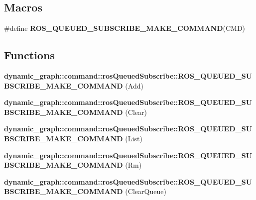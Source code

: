 \subsection*{Macros}
\begin{DoxyCompactItemize}
\item 
\#define {\bfseries R\+O\+S\+\_\+\+Q\+U\+E\+U\+E\+D\+\_\+\+S\+U\+B\+S\+C\+R\+I\+B\+E\+\_\+\+M\+A\+K\+E\+\_\+\+C\+O\+M\+M\+A\+ND}(C\+MD)
\end{DoxyCompactItemize}
\subsection*{Functions}
\begin{DoxyCompactItemize}
\item 
\mbox{\label{ros__queued__subscribe_8hh_aef1263d3cfe9681448c0d69649179259}} 
{\bfseries dynamic\+\_\+graph\+::command\+::ros\+Queued\+Subscribe\+::\+R\+O\+S\+\_\+\+Q\+U\+E\+U\+E\+D\+\_\+\+S\+U\+B\+S\+C\+R\+I\+B\+E\+\_\+\+M\+A\+K\+E\+\_\+\+C\+O\+M\+M\+A\+ND} (Add)
\item 
\mbox{\label{ros__queued__subscribe_8hh_a7845a3bacdc7be03123b88140ea091f9}} 
{\bfseries dynamic\+\_\+graph\+::command\+::ros\+Queued\+Subscribe\+::\+R\+O\+S\+\_\+\+Q\+U\+E\+U\+E\+D\+\_\+\+S\+U\+B\+S\+C\+R\+I\+B\+E\+\_\+\+M\+A\+K\+E\+\_\+\+C\+O\+M\+M\+A\+ND} (Clear)
\item 
\mbox{\label{ros__queued__subscribe_8hh_a4c330a8b4a91c14660428bd492055941}} 
{\bfseries dynamic\+\_\+graph\+::command\+::ros\+Queued\+Subscribe\+::\+R\+O\+S\+\_\+\+Q\+U\+E\+U\+E\+D\+\_\+\+S\+U\+B\+S\+C\+R\+I\+B\+E\+\_\+\+M\+A\+K\+E\+\_\+\+C\+O\+M\+M\+A\+ND} (List)
\item 
\mbox{\label{ros__queued__subscribe_8hh_ae6258e34dff92af9fbbfa2eb7e6417d7}} 
{\bfseries dynamic\+\_\+graph\+::command\+::ros\+Queued\+Subscribe\+::\+R\+O\+S\+\_\+\+Q\+U\+E\+U\+E\+D\+\_\+\+S\+U\+B\+S\+C\+R\+I\+B\+E\+\_\+\+M\+A\+K\+E\+\_\+\+C\+O\+M\+M\+A\+ND} (Rm)
\item 
\mbox{\label{ros__queued__subscribe_8hh_a42b7f79773943fc41f6a89e21016c8c8}} 
{\bfseries dynamic\+\_\+graph\+::command\+::ros\+Queued\+Subscribe\+::\+R\+O\+S\+\_\+\+Q\+U\+E\+U\+E\+D\+\_\+\+S\+U\+B\+S\+C\+R\+I\+B\+E\+\_\+\+M\+A\+K\+E\+\_\+\+C\+O\+M\+M\+A\+ND} (Clear\+Queue)

\end{DoxyCompactItemize}
